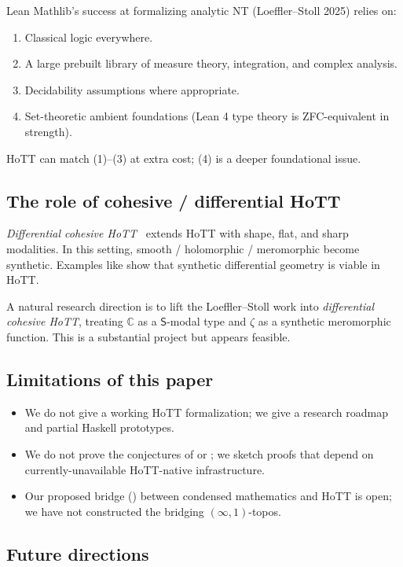 \documentclass[12pt]{article}
\theoremstyle{definition}
\theoremstyle{remark}
\newcommand{\C}{\mathbb{C}}
\newcommand{\esh}{\mathsf{S}}      %
\begin{document}
Lean Mathlib's success at formalizing analytic NT (Loeffler--Stoll 2025)
relies on:
\begin{enumerate}
\item Classical logic everywhere.
\item A large prebuilt library of measure theory, integration, and complex
analysis.
\item Decidability assumptions where appropriate.
\item Set-theoretic ambient foundations (Lean 4 type theory is
ZFC-equivalent in strength).
\end{enumerate}
HoTT can match (1)--(3) at extra cost; (4) is a deeper foundational issue.

\subsection{The role of cohesive / differential HoTT}

\emph{Differential cohesive HoTT}~\cite{Schreiber2013, Wellen2018} extends
HoTT with shape, flat, and sharp modalities. In this setting, smooth /
holomorphic / meromorphic become synthetic. Examples like
\cite{ScreiberShulman2014QFT} show that synthetic differential geometry is
viable in HoTT.

A natural research direction is to lift the Loeffler--Stoll work into
\emph{differential cohesive HoTT}, treating $\C$ as a $\esh$-modal type and
$\zeta$ as a synthetic meromorphic function. This is a substantial project
but appears feasible.

\subsection{Limitations of this paper}

\begin{itemize}
\item We do not give a working HoTT formalization; we give a research
roadmap and partial Haskell prototypes.
\item We do not prove the conjectures of  or
; we sketch proofs that depend on currently-unavailable
HoTT-native infrastructure.
\item Our proposed bridge () between condensed mathematics
and HoTT is open; we have not constructed the bridging $(\infty,1)$-topos.
\end{itemize}

\subsection{Future directions}
\end{document}
